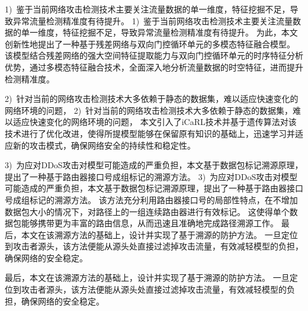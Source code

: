1)~鉴于当前网络攻击检测技术主要关注流量数据的单一维度，特征挖掘不足，导致异常流量检测精准度有待提升。
1)~鉴于当前网络攻击检测技术主要关注流量数据的单一维度，特征挖掘不足，导致异常流量检测精准度有待提升。
为此，本文创新性地提出了一种基于残差网络与双向门控循环单元的多模态特征融合模型。
该模型结合残差网络的强大空间特征提取能力与双向门控循环单元的时序特征分析优势，通过多模态特征融合技术，全面深入地分析流量数据的时空特征，进而提升检测精准度。\par

2)~针对当前的网络攻击检测技术大多依赖于静态的数据集，难以适应快速变化的网络环境的问题，
2)~针对当前的网络攻击检测技术大多依赖于静态的数据集，难以适应快速变化的网络环境的问题，
本文引入了iCaRL技术并基于遗传算法对该技术进行了优化改进，使得所提模型能够在保留原有知识的基础上，迅速学习并适应新的攻击模式，确保网络安全的持续性和稳定性。\par

3)~为应对DDoS攻击对模型可能造成的严重负担，本文基于数据包标记溯源原理，提出了一种基于路由器接口号成组标记的溯源方法。
3)~为应对DDoS攻击对模型可能造成的严重负担，本文基于数据包标记溯源原理，提出了一种基于路由器接口号成组标记的溯源方法。
该方法充分利用路由器接口号的局部性特点，在不增加数据包大小的情况下，对路径上的一组连续路由器进行有效标记。             
这使得单个数据包能够携带更为丰富的路由信息，从而迅速且准确地完成路径溯源工作。
最后，本文在该溯源方法的基础上，设计并实现了基于溯源的防护方法。
一旦定位到攻击者源头，该方法便能从源头处直接过滤掉攻击流量，有效减轻模型的负担，确保网络的安全稳定。\par
最后，本文在该溯源方法的基础上，设计并实现了基于溯源的防护方法。
一旦定位到攻击者源头，该方法便能从源头处直接过滤掉攻击流量，有效减轻模型的负担，确保网络的安全稳定。\par


